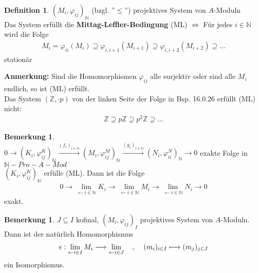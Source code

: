 \documentclass[10pt,a4paper,numbers=endperiod]{scrreprt}
\theoremstyle{definition}
\newtheorem{defi}[satz]{Definition}
\newtheorem{bem}[satz]{Bemerkung}
\def\NN{{\mathbb N}}
\def\ZZ{{\mathbb Z}}
\begin{document}
\begin{defi}
	$(M_i, \varphi_{ij})_\NN$ (bzgl. ''$\leq$'') projektives System von $A$-Moduln\\
	Das System erfüllt die \textbf{Mittag-Leffler-Bedingung} (ML) 
	$\Leftrightarrow$ Für jedes $i \in \NN$ wird die Folge \begin{align*}
		M_i = \varphi_{ii} (M_i) \supseteq \varphi_{i, i+1} (M_{i+1}) \supseteq \varphi_{i, i+2} (M_{i+2}) \supseteq \ldots
	\end{align*}
	stationär
\end{defi}

\textbf{Anmerkung:} Sind die Homomorphismen $\varphi_{ij}$ alle surjektiv oder sind alle $M_i$ endlich, so ist (ML) erfüllt.\\
Das System $(\ZZ, \cdot p)$ von der linken Seite der Folge in Bsp. 16.0.26 erfüllt (ML) nicht: \begin{align*}
	\ZZ \supseteq p \ZZ \supseteq p^2 \ZZ \supseteq \ldots
\end{align*}

\begin{bem}
	$ $\\
	$0 \longrightarrow (K_i, \varphi_{ij}^K)_\NN \overset{{(f_i)_{i \in \NN}}}{\longrightarrow} (M_i, \varphi_{ij}^M)_\NN \overset{(g_i)_{i \in \NN}}{\longrightarrow} (N_i, \varphi_{ii}^N)_\NN \longrightarrow 0$ exakte Folge in $\NN-Pro-A-Mod$\\
	$(K_i, \varphi_{ij}^K)_\NN$ erfülle (ML). Dann ist die Folge \begin{align*}
		0 \longrightarrow  \lim\limits_{\leftarrow i \in \NN} K_i \longrightarrow \lim\limits_{\leftarrow i \in \NN} M_i \longrightarrow \lim\limits_{\leftarrow i \in \NN} N_i \longrightarrow 0
	\end{align*}
	exakt. 
\end{bem}

\begin{bem}
	$J \subseteq I$ kofinal, $(M_i, \varphi_{ij})_I$ projektives System von $A$-Moduln.\\
	Dann ist der natürlich Homomorphismus \begin{align*}
		\epsilon: \lim\limits_{\leftarrow i \in I} M_i \longrightarrow \lim\limits_{\leftarrow i \in J} \hspace*{4mm} , \hspace*{4mm} (m_i)_{i \in I} \longmapsto (m_j)_{j \in J} 
	\end{align*}
	ein Isomorphismus. 
\end{bem}
\end{document}
